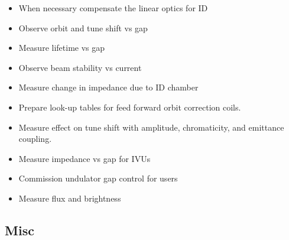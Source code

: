 \documentclass[11pt,oneside,letterpaper,showtrims,article]{memoir}
\begin{document}
\begin{itemize}
\item When necessary compensate the linear optics for ID
\item Observe orbit and tune shift vs gap
\item Measure lifetime vs gap
\item Observe beam stability vs current
\item Measure change in impedance due to ID chamber
\item Prepare look-up tables for feed forward orbit correction coils.
\item Measure effect on tune shift with amplitude, chromaticity, and emittance coupling.
\item Measure impedance vs gap for IVUs
\item Commission undulator gap control for users
\item Measure flux and brightness
\end{itemize}

\subsection{Misc}
\end{document}
